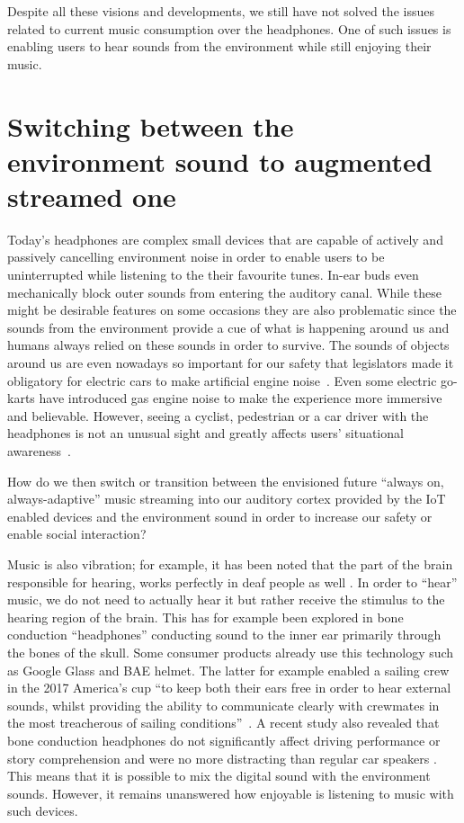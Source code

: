 \documentclass[sigchi]{acmart}
\begin{document}
Despite all these visions and developments, we still have not solved the issues related to current music consumption over the headphones. One of such issues is enabling users to hear sounds from the environment while still enjoying their music. 

\section{Switching between the environment sound to augmented streamed one}

Today's headphones are complex small devices that are capable of actively and passively cancelling environment noise in order to enable users to be uninterrupted while listening to the their favourite tunes. In-ear buds even mechanically block outer sounds from entering the auditory canal. While these might be desirable features on some occasions they are also problematic since the sounds from the environment provide a cue of what is happening around us and humans always relied on these sounds in order to survive. The sounds of objects around us are even nowadays so important for our safety that legislators made it obligatory for electric cars to make artificial engine noise~\cite{guy2019carnoise}. Even some electric go-karts have introduced gas engine noise to make the experience more immersive and believable. However, seeing a cyclist, pedestrian or a car driver with the headphones is not an unusual sight and greatly affects users' situational awareness~\cite{roads2018headphonedriving}. 

How do we then switch or transition between the envisioned future ``always on, always-adaptive'' music streaming into our auditory cortex provided by the IoT enabled devices and the environment sound in order to increase our safety or enable social interaction? 

Music is also vibration; for example, it has been noted that the part of the brain responsible for hearing, works perfectly in deaf people as well \cite{abcsciencemusic}. In order to ``hear'' music, we do not need to actually hear it but rather receive the stimulus to the hearing region of the brain. This has for example been explored in bone conduction ``headphones'' conducting sound to the inner ear primarily through the bones of the skull. Some consumer products already use this technology such as Google Glass and BAE helmet. The latter for example enabled a sailing crew in the 2017 America's cup ``to keep both their ears free in order to hear external sounds, whilst providing the ability to communicate clearly with crewmates in the most treacherous of sailing conditions''~\cite{bae2019boneconhelmet}. A recent study also revealed that bone conduction headphones do not significantly affect driving performance or story comprehension and were no more distracting than regular car speakers \cite{granados2018usability}. This means that it is possible to mix the digital sound with the environment sounds. However, it remains unanswered how enjoyable is listening to music with such devices. 
\end{document}
